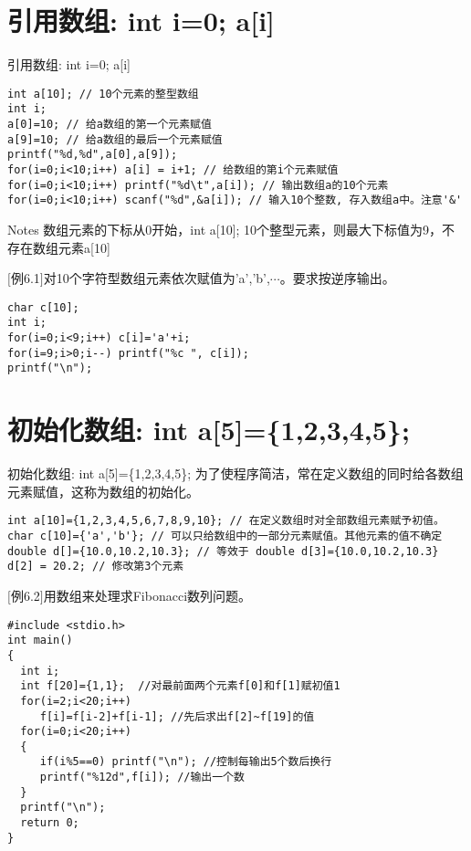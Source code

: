 \section{引用数组: int i=0; a[i]}

\begin{frame}{引用数组: int i=0; a[i]}
\begin{lstlisting}
int a[10]; // 10个元素的整型数组
int i;
a[0]=10; // 给a数组的第一个元素赋值
a[9]=10; // 给a数组的最后一个元素赋值
printf("%d,%d",a[0],a[9]);
for(i=0;i<10;i++) a[i] = i+1; // 给数组的第i个元素赋值
for(i=0;i<10;i++) printf("%d\t",a[i]); // 输出数组a的10个元素
for(i=0;i<10;i++) scanf("%d",&a[i]); // 输入10个整数, 存入数组a中。注意'&'
\end{lstlisting}
\begin{block}{Notes}
	数组元素的下标从0开始，int a[10]; 10个整型元素，则最大下标值为9，不存在数组元素a[10]
\end{block}
\end{frame}

\begin{frame}
$[$例6.1$]$对10个字符型数组元素依次赋值为'a','b',$\cdots$。要求按逆序输出。
\pause
\begin{lstlisting}
char c[10];
int i;
for(i=0;i<9;i++) c[i]='a'+i;
for(i=9;i>0;i--) printf("%c ", c[i]);
printf("\n");
\end{lstlisting}
\end{frame}

\section{初始化数组: int a[5]=\{1,2,3,4,5\};}

\begin{frame}{初始化数组: int a[5]=\{1,2,3,4,5\};}
为了使程序简洁，常在定义数组的同时给各数组元素赋值，这称为数组的初始化。
\begin{lstlisting}
int a[10]={1,2,3,4,5,6,7,8,9,10}; // 在定义数组时对全部数组元素赋予初值。
char c[10]={'a','b'}; // 可以只给数组中的一部分元素赋值。其他元素的值不确定
double d[]={10.0,10.2,10.3}; // 等效于 double d[3]={10.0,10.2,10.3}
d[2] = 20.2; // 修改第3个元素
\end{lstlisting}
\end{frame}

\begin{frame}
$[$例6.2$]$用数组来处理求Fibonacci数列问题。
\begin{lstlisting}
#include <stdio.h>
int main()
{
  int i;
  int f[20]={1,1};  //对最前面两个元素f[0]和f[1]赋初值1
  for(i=2;i<20;i++)
     f[i]=f[i-2]+f[i-1]; //先后求出f[2]~f[19]的值
  for(i=0;i<20;i++)
  {
     if(i%5==0) printf("\n"); //控制每输出5个数后换行
     printf("%12d",f[i]); //输出一个数
  }
  printf("\n");
  return 0;
}
\end{lstlisting}
\end{frame}

